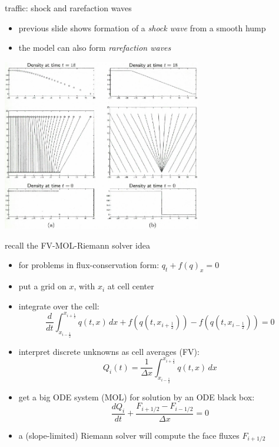 \documentclass[10pt,hyperref,dvipsnames]{beamer}
\newcommand{\xiphalf}{{x_{i+\frac{1}{2}}}}
\newcommand{\ximhalf}{{x_{i-\frac{1}{2}}}}
\begin{document}
\begin{frame}{traffic: shock and rarefaction waves}

\begin{itemize}
\item previous slide shows formation of a \emph{shock wave} from a smooth hump
\item the model can also form \emph{rarefaction waves}
\end{itemize}

\begin{center}
\includegraphics[width=0.65\textwidth]{figs/leveque11p3}
\end{center}
\end{frame}


\begin{frame}{recall the FV-MOL-Riemann solver idea}

\begin{itemize}
\item for problems in flux-conservation form: \quad $q_t + f(q)_x = 0$
\item put a grid on $x$, with $x_i$ at cell center
\item integrate over the cell:
    $$\frac{d}{dt} \int_\ximhalf^\xiphalf q(t,x) \,dx + f\left(q(t,\xiphalf)\right) - f\left(q(t,\ximhalf)\right) = 0$$
\item interpret discrete unknowns as cell averages (FV):
    $$Q_i(t) = \frac{1}{\Delta x} \int_\ximhalf^\xiphalf q(t,x)\,dx$$
\item get a big ODE system (MOL) for solution by an ODE black box:
    $$\frac{dQ_i}{dt} + \frac{F_{i+1/2} - F_{i-1/2}}{\Delta x} = 0$$
\item a (slope-limited) Riemann solver will compute the face fluxes $F_{i+1/2}$
\end{itemize}
\end{frame}
\end{document}
